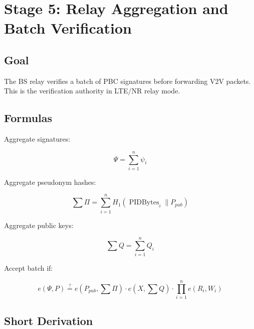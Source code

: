 \documentclass[11pt,a4paper]{article}
\begin{document}






\section{Stage 5: Relay Aggregation and Batch Verification}

\subsection{Goal}

The BS relay verifies a batch of PBC signatures before forwarding V2V packets.
This is the verification authority in LTE/NR relay mode.

\subsection{Formulas}

Aggregate signatures:

\[
\Psi=\sum_{i=1}^{n}\psi_i
\]

Aggregate pseudonym hashes:

\[
\sum\Pi=\sum_{i=1}^{n}H_1(\operatorname{PIDBytes}_i\parallel P_{pub})
\]

Aggregate public keys:

\[
\sum Q=\sum_{i=1}^{n}Q_i
\]

Accept batch if:

\[
e(\Psi,P)\stackrel{?}{=}
e(P_{pub},\sum\Pi)\cdot e(X,\sum Q)\cdot
\prod_{i=1}^{n} e(R_i,W_i)
\]

\subsection{Short Derivation}
\end{document}

